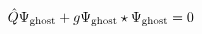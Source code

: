 \begin{equation}
\hat{Q} \Psi_{\rm ghost} + g \Psi_{\rm ghost}\star\Psi_{\rm ghost} = 0
\label{eq:EOM-ghosts}
\end{equation}

